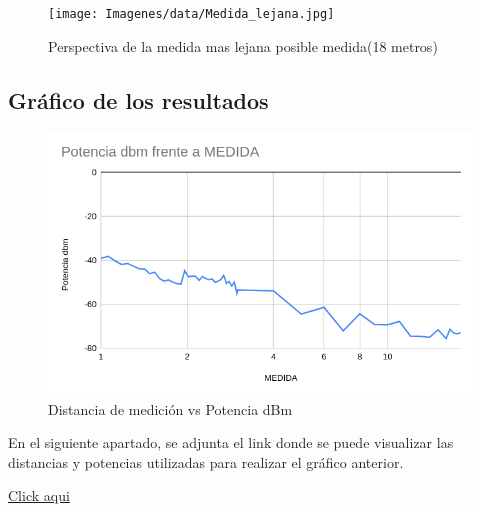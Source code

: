   \begin{figure}[H]
        \centering
        \texttt{[image: Imagenes/data/Medida\_lejana.jpg]}
        \caption{Perspectiva de la medida mas lejana posible medida(18 metros)}
        \label{18m}
  \end{figure}

\subsection{Gráfico de los resultados}

  \begin{figure}[H]
        \centering
        \includegraphics[width=\linewidth]{Imagenes/grafico.png}
        \caption{Distancia de medición vs Potencia dBm}
        \label{fig:grafico}
  \end{figure}
  
En el siguiente apartado, se adjunta el link donde se puede visualizar las distancias y potencias utilizadas para realizar el gráfico anterior.

\href{https://docs.google.com/spreadsheets/d/1fRkynR8ZBY9CO_3KUc9rnQAkz-86-G7ja93jMy49Xnk/edit?usp=sharing}{Click aqui}